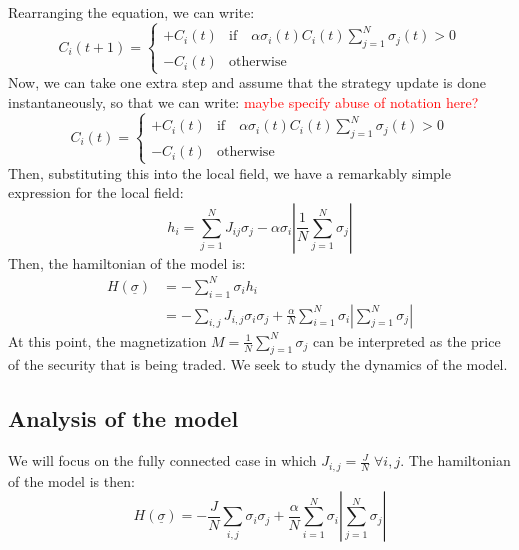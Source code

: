 Rearranging the equation, we can write:
\begin{equation}
    C_i(t+1) = \begin{cases}
        +C_i(t) & \text{if} \quad \alpha\sigma_i(t)C_i(t) \sum_{j=1}^N \sigma_j(t)> 0\\
        -C_i(t) & \text{otherwise}
    \end{cases}
\end{equation}
Now, we can take one extra step and assume that the strategy update is done instantaneously, so that we can  write:
\textcolor{red}{maybe specify abuse of notation here?}
\begin{equation}
    C_i(t) = \begin{cases}
        +C_i(t) & \text{if} \quad \alpha\sigma_i(t)C_i(t) \sum_{j=1}^N \sigma_j(t)> 0\\
        -C_i(t) & \text{otherwise}
    \end{cases}
\end{equation}
Then, substituting this into the local field, we have a remarkably simple expression for the local field:
\begin{equation}
    h_i=\sum_{j=1}^N J_{i j} \sigma_j-\alpha \sigma_i \left | \frac{1}{N}\sum_{j=1}^N \sigma_j \right |
\end{equation}
Then, the hamiltonian of the model is:
\begin{equation}
    \begin{aligned}
        H(\underline{\sigma}) &= -\sum_{i=1}^N \sigma_i h_i\\
        &= -\sum_{i,j}J_{i,j}\sigma_i\sigma_j + \frac{\alpha}{N}\sum_{i=1}^N \sigma_i \left | \sum_{j=1}^N \sigma_j \right |
    \end{aligned}
\end{equation}
At this point, the magnetization \(M = \frac{1}{N}\sum_{j=1}^N \sigma_j\) can be interpreted as the price of the security that is being traded. We seek to study the dynamics of the model.

\subsection{Analysis of the model}
We will focus on the fully connected case in which \(J_{i,j}=\frac{J}{N} \; \forall i,j\). The hamiltonian of the model is then:
\begin{equation}
    H(\underline{\sigma}) = -\frac{J}{N}\sum_{i,j}\sigma_i\sigma_j + \frac{\alpha}{N}\sum_{i=1}^N \sigma_i \left | \sum_{j=1}^N \sigma_j \right |
\end{equation}

